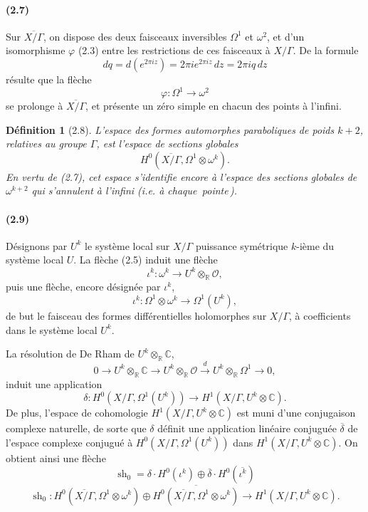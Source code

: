 \documentclass[10pt]{article}
\newcommand{\C}{\mathbb C}
\newcommand{\R}{\mathbb R}
\newcommand{\cO}{\mathcal O}
\newcommand{\sh}{\operatorname{sh}}
\newcommand{\frquote}[1]{\guillemotleft{}\,#1\,\guillemotright{}}
\newtheorem*{definition}{Définition}
\begin{document}
\paragraph{(2.7)}
Sur $\overline{X/\Gamma}$, on dispose des deux faisceaux inversibles $\Omega^1$ et
$\omega^2$, et d'un isomorphisme $\varphi$ (2.3) entre les restrictions de ces faisceaux à
$X/\Gamma$. De la formule
\[
dq=d(e^{2\pi iz})=2\pi i e^{2\pi iz}\,dz=2\pi iq\,dz
\]
résulte que la flèche
\[
\varphi:\Omega^1\to \omega^2
\]
se prolonge à $\overline{X/\Gamma}$, et présente un zéro simple en chacun des points à
l'infini.

\begin{definition}[2.8]
L'espace des formes automorphes paraboliques de poids $k+2$, relatives au groupe
$\Gamma$, est l'espace de sections globales
\[
H^0(\overline{X/\Gamma},\Omega^1\otimes\omega^k).
\]
En vertu de (2.7), cet espace s'identifie encore à l'espace des sections globales de
$\omega^{k+2}$ qui s'annulent à l'infini (\textit{i.e.} à chaque \frquote{pointe}).
\end{definition}

\paragraph{(2.9)}
Désignons par $U^k$ le système local sur $X/\Gamma$ puissance symétrique $k$-ième du
système local $U$. La flèche (2.5) induit une flèche
\[
\iota^k:\omega^k\to U^k\otimes_\R\cO,
\]
puis une flèche, encore désignée par $\iota^k$,
\[
\iota^k:\Omega^1\otimes\omega^k\to \Omega^1(U^k),
\]
de but le faisceau des formes différentielles holomorphes sur $X/\Gamma$, à coefficients
dans le système local $U^k$.

La résolution de De Rham de $U^k\otimes_\R\C$,
\[
0\to U^k\otimes_\R\C\to U^k\otimes_\R\cO
\xrightarrow{d}U^k\otimes_\R\Omega^1\to 0,
\]
induit une application
\[
\delta:H^0(X/\Gamma,\Omega^1(U^k))\to H^1(X/\Gamma,U^k\otimes\C).
\]
De plus, l'espace de cohomologie $H^1(X/\Gamma,U^k\otimes\C)$ est muni d'une
conjugaison complexe naturelle, de sorte que $\delta$ définit une application linéaire
conjuguée $\overline{\delta}$ de l'espace complexe conjugué à
$H^0(X/\Gamma,\Omega^1(U^k))$ dans $H^1(X/\Gamma,U^k\otimes\C)$. On obtient ainsi une
flèche
\[
\sh_0=\delta\cdot H^0(\iota^k)\oplus
\overline{\delta}\cdot H^0(\overline{\iota^k})
\]
\[
\sh_0:
H^0(\overline{X/\Gamma},\Omega^1\otimes\omega^k)
\oplus
\overline{H^0(\overline{X/\Gamma},\Omega^1\otimes\omega^k)}
\longrightarrow
H^1(X/\Gamma,U^k\otimes\C).
\]
\end{document}
